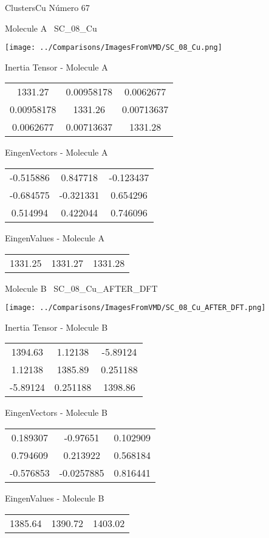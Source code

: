 \vtab[-3cm]
\begin{center}
{\large ClustersCu \tab Número 67}
\end{center}
\begin{multicols}{2}
\begin{center}

Molecule A \
SC\_08\_Cu

\texttt{[image: ../Comparisons/ImagesFromVMD/SC\_08\_Cu.png]}

Inertia Tensor - Molecule A \\
\begin{tabular}{|c c c|}
1331.27	 & 	0.00958178	 & 	0.0062677	 \\
0.00958178	 & 	1331.26	 & 	0.00713637	 \\
0.0062677	 & 	0.00713637	 & 	1331.28
\end{tabular}

\vtab
 EingenVectors - Molecule A     \\
\begin{tabular}{|c c c|}
-0.515886	 & 	0.847718	 & 	-0.123437	 \\
-0.684575	 & 	-0.321331	 & 	0.654296	 \\
0.514994	 & 	0.422044	 & 	0.746096
\end{tabular}

\vtab
 EingenValues - Molecule A     \\
\begin{tabular}{|c c c|}
1331.25	 & 	1331.27	 & 	1331.28	 \\
\end{tabular}
\columnbreak

Molecule B \
SC\_08\_Cu\_AFTER\_DFT

\texttt{[image: ../Comparisons/ImagesFromVMD/SC\_08\_Cu\_AFTER\_DFT.png]}

Inertia Tensor - Molecule B \\
\begin{tabular}{|c c c|}
1394.63	 & 	1.12138	 & 	-5.89124	 \\
1.12138	 & 	1385.89	 & 	0.251188	 \\
-5.89124	 & 	0.251188	 & 	1398.86
\end{tabular}

\vtab
 EingenVectors - Molecule B     \\
\begin{tabular}{|c c c|}
0.189307	 & 	-0.97651	 & 	0.102909	 \\
0.794609	 & 	0.213922	 & 	0.568184	 \\
-0.576853	 & 	-0.0257885	 & 	0.816441
\end{tabular}

\vtab
 EingenValues - Molecule B     \\
\begin{tabular}{|c c c|}
1385.64	 & 	1390.72	 & 	1403.02	 \\
\end{tabular}

\end{center}
\end{multicols}

